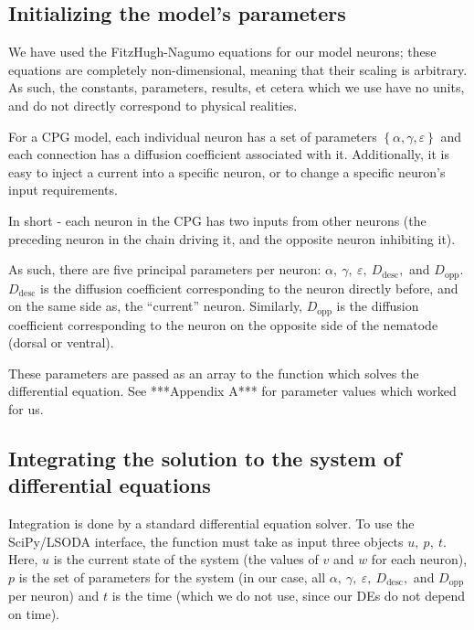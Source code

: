 \documentclass[
    11pt,
]{article}
\begin{document}
\subsection{Initializing the model's parameters}

We have used the FitzHugh-Nagumo equations for our model neurons; these equations are completely non-dimensional, meaning that their scaling is arbitrary.  As such, the constants, parameters, results, et cetera which we use have no units, and do not directly correspond to physical realities.

For a CPG model, each individual neuron has a set of parameters $\left\{α, γ, ε\right\}$ and each connection has a diffusion coefficient associated with it.  Additionally, it is easy to inject a current into a specific neuron, or to change a specific neuron's input requirements.

In short - each neuron in the CPG has two inputs from other neurons (the preceding neuron in the chain driving it, and the opposite neuron inhibiting it).

As such, there are five principal parameters per neuron: $α,\ γ,\ ε,\ D_\mathrm{desc},$ and $D_\mathrm{opp}$.  $D_\mathrm{desc}$ is the diffusion coefficient corresponding to the neuron directly before, and on the same side as, the ``current'' neuron.  Similarly, $D_\mathrm{opp}$ is the diffusion coefficient corresponding to the neuron on the opposite side of the nematode (dorsal or ventral).

These parameters are passed as an array to the function which solves the differential equation.  See ***Appendix A*** for parameter values which worked for us.

\subsection{Integrating the solution to the system of differential equations}

Integration is done by a standard differential equation solver.  To use the SciPy/LSODA interface, the function must take as input three objects $u,\ p,\ t$.  Here, $u$ is the current state of the system (the values of $v$ and $w$ for each neuron), $p$ is the set of parameters for the system (in our case, all $α,\ γ,\ ε,\ D_\mathrm{desc},$ and $D_\mathrm{opp}$ per neuron) and $t$ is the time (which we do not use, since our DEs do not depend on time).
\end{document}
